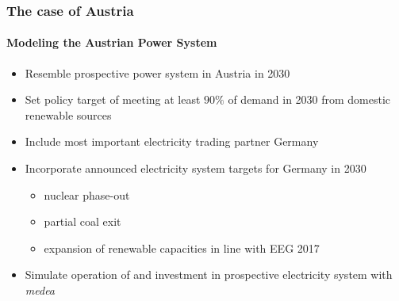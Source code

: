 \documentclass[aspectratio=1610, xcolor=dvipsnames,handout]{beamer} %
\begin{document}
    \begin{frame}
        \frametitle{The case of Austria}
        \framesubtitle{Modeling the Austrian Power System}
        \begin{itemize}
            \item Resemble prospective power system in Austria in 2030
            \item Set policy target of meeting at least $90\%$ of demand in 2030 from domestic renewable sources
            \medskip
            \item Include most important electricity trading partner Germany
            \item Incorporate announced electricity system targets for Germany in 2030
            \begin{itemize}
                \item nuclear phase-out
                \item partial coal exit
                \item expansion of renewable capacities in line with EEG 2017
            \end{itemize}
            \medskip
            \item Simulate operation of and investment in prospective electricity system with \emph{medea}
        \end{itemize}
    \end{frame}
\end{document}
